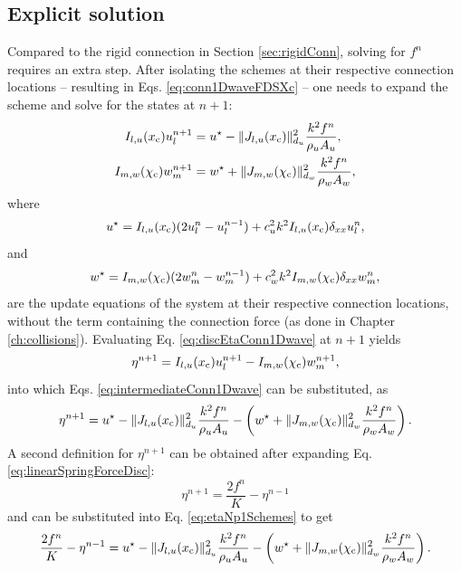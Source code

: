 \subsection{Explicit solution}\label{sec:explicitSolutionSpringConn}
Compared to the rigid connection in Section \ref{sec:rigidConn}, solving for $f^n$ requires an extra step. After isolating the schemes at their respective connection locations -- resulting in Eqs. \eqref{eq:conn1DwaveFDSXc} -- one needs to expand the scheme and solve for the states at $n+1$:
\begin{subequations}\label{eq:intermediateConn1Dwave}
    \begin{align}
        I_{l, u}(x_{\text{c}}) u_l^{n+1} &= u^\star - \lVert J_{l, u}(x_{\text{c}})\rVert_{d_u}^2 \frac{k^2f^n}{\rho_u A_u},\\
        I_{m, w}(\chi_{\text{c}}) w_m^{n+1} &= w^\star + \lVert J_{m, w}(\chi_{\text{c}})\rVert_{d_w}^2 \frac{k^2f^n}{\rho_w A_w},
    \end{align}
\end{subequations}
where
\begin{equation*}
    u^\star = I_{l, u}(x_{\text{c}})(2u_l^n - u_l^{n-1}) + c_u^2k^2I_{l, u}(x_{\text{c}})\delta_{xx}u_l^n,
\end{equation*}
and
\begin{equation*}
    w^\star = I_{m, w}(\chi_{\text{c}})(2w_m^n - w_m^{n-1}) + c_w^2k^2I_{m, w}(\chi_{\text{c}})\delta_{xx}w_m^n,
\end{equation*}
are the update equations of the system at their respective connection locations, without the term containing the connection force (as done in Chapter \ref{ch:collisions}). Evaluating Eq. \eqref{eq:discEtaConn1Dwave} at $n+1$ yields
\begin{equation*}
    \eta^{n+1} = I_{l, u}(x_{\text{c}}) u_l^{n+1} - I_{m, w}(\chi_{\text{c}}) w_m^{n+1},
\end{equation*}
into which Eqs. \eqref{eq:intermediateConn1Dwave} can be substituted, as
\begin{equation}\label{eq:etaNp1Schemes}
    \eta^{n+1} = u^\star - \lVert J_{l, u}(x_{\text{c}})\rVert_{d_u}^2 \frac{k^2f^n}{\rho_u A_u} - \left(w^\star + \lVert J_{m, w}(\chi_{\text{c}})\rVert_{d_w}^2 \frac{k^2f^n}{\rho_w A_w}\right).
\end{equation}
A second definition for $\eta^{n+1}$ can be obtained after expanding Eq. \eqref{eq:linearSpringForceDisc}:
\begin{equation}\label{eq:etaExpanded}
    \eta^{n+1} = \frac{2 f^n}{K} - \eta^{n-1}
\end{equation}
and can be substituted into Eq. \eqref{eq:etaNp1Schemes} to get
\begin{equation}
    \frac{2 f^n}{K} - \eta^{n-1} = u^\star - \lVert J_{l, u}(x_{\text{c}})\rVert_{d_u}^2 \frac{k^2f^n}{\rho_u A_u} - \left(w^\star + \lVert J_{m, w}(\chi_{\text{c}})\rVert_{d_w}^2 \frac{k^2f^n}{\rho_w A_w}\right).
\end{equation}
